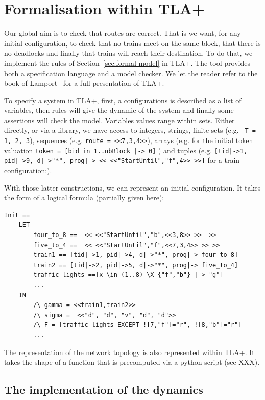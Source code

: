 \documentclass[runningheads]{llncs}
\begin{document}
\section{Formalisation within TLA+}
\label{sec:tla-formalisation}

Our global aim is to check that routes are correct. That is we want, for any initial configuration, to check that no trains meet on the same block, that there is no deadlocks and finally  that trains will reach their destination. To do that, we implement the rules of Section~\ref{sec:formal-model} in TLA+. The tool provides both a specification language and a model checker. We let the reader refer to the book of Lamport~\cite{Lamport} for a full presentation of TLA+. 

To specify a system in TLA+, first, a configurations is described as a list of variables, then rules  will give the dynamic of the system and finally some assertions  will check the model.  Variables values range within sets. Either directly, or via a library, we have access to integers, strings, finite sets (e.g. \texttt{ T = {1, 2, 3}}), sequences (e.g. \texttt{route = <<7,3,4>>}),  arrays (e.g. for the initial token valuation \texttt{token = [bid in 1..nbBlock |-> 0]} ) and tuples (e.g. \texttt{[tid|->1, pid|->9, d|->"*", prog|-> << <<"StartUntil","f",4>> >>]}  for a train configuration:).

With those latter constructions, we can represent an initial configuration. It takes the form of a logical formula (partially given here):
\begin{verbatim}
Init == 
    LET 
        four_to_8 ==  << <<"StartUntil","b",<<3,8>> >>  >>
        five_to_4 ==  << <<"StartUntil","f",<<7,3,4>> >> >>
        train1 == [tid|->1, pid|->4, d|->"*", prog|-> four_to_8]
        train2 == [tid|->2, pid|->5, d|->"*", prog|-> five_to_4]
        traffic_lights ==[x \in (1..8) \X {"f","b"} |-> "g"]
        ...
    IN
        /\ gamma = <<train1,train2>>
        /\ sigma =  <<"d", "d", "v", "d", "d">> 
        /\ F = [traffic_lights EXCEPT ![7,"f"]="r", ![8,"b"]="r"]
        ...
\end{verbatim}

The representation of the network topology is also represented within TLA+. It takes the shape of a function that is precomputed via a python script (see XXX). 

\subsection{The implementation of the dynamics}
\end{document}
